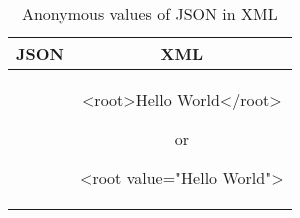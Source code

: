 \begin{longtable}{c|c}
	\caption{Anonymous values of JSON in XML}
	\label{tbl:Anonymous-xmljson}\\
	\textbf{JSON} & \textbf{XML}\\
	\hline
\begin{minipage}{.35\textwidth}
\begin{fakeJSON}
\end{fakeJSON}	
\end{minipage} &
\begin{minipage}{.45\textwidth}
\begin{fakeXML}[label=xml-anonymous]
	<root>Hello World</root>
\end{fakeXML}
or
\begin{fakeXML}
	<root value="Hello World">
\end{fakeXML}
\end{minipage}\\
\end{longtable}
	
	
		
